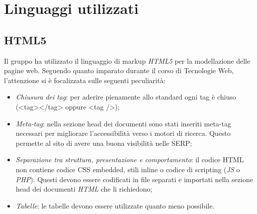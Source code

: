 \section{Linguaggi utilizzati}

\subsection{HTML5}
Il gruppo ha utilizzato il linguaggio di markup \textit{HTML5} per la modellazione delle pagine web.
Seguendo quanto imparato durante il corso di Tecnologie Web, l'attenzione si è focalizzata sulle
seguenti peculiarità:
\begin{itemize}
	\item \textit{Chiusura dei tag}: per aderire pienamente allo standard ogni tag è chiuso 
	({\textless}tag{\textgreater}{\textless}/tag{\textgreater} oppure {\textless}tag /{\textgreater});
	\item \textit{Meta-tag}: nella sezione head dei documenti sono stati inseriti meta-tag necessari per
	migliorare l'accessibilità verso i motori di ricerca. Questo permette al sito di avere una buona
	visibilità nelle SERP;
	\item \textit{Separazione tra struttura, presentazione e comportamento}: il codice HTML non contiene
	codice CSS embedded, stili inline o codice di scripting (\textit{JS} o \textit{PHP}). Questi devono
	essere codificati in file separati e importati nella sezione head dei documenti \textit{HTML} che
	li richiedono;
	\item \textit{Tabelle}: le tabelle devono essere utilizzate quanto meno possibile.
\end{itemize}

